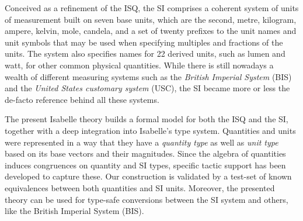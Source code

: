 \documentclass[11pt,a4paper]{book}
\begin{document}
Conceived as a refinement of the ISQ, the SI comprises a coherent system of units of measurement built
 on seven base units, which are the second, metre, kilogram, ampere, kelvin, mole, candela, and a 
set of twenty prefixes to the unit names and unit symbols that may be used when specifying multiples 
and fractions of the units. The system also specifies names for 22 derived units, such as lumen and 
watt, for other common physical quantities. While there is still nowadays a wealth of different 
measuring systems such as the \emph{British Imperial System} (BIS) and the \emph{United States 
customary system} (USC), the SI became more or less the de-facto reference behind all these systems.

The present Isabelle theory builds a formal model for both the ISQ and the SI, together with a 
deep integration into Isabelle's type system\cite{nipkow.ea:isabelle:2002}. Quantities and units 
were represented in a way that they have a  \emph{quantity type} as well as \emph{unit type} based 
on its base vectors and their magnitudes. Since the algebra of quantities induces congruences on 
quantity and SI types, specific tactic support has been developed to capture these.
Our construction is validated by a test-set of known equivalences between both quantities and SI units.
Moreover, the presented theory can be used for type-safe conversions between the SI system and
others, like the British Imperial System (BIS).


% 
\end{document}
